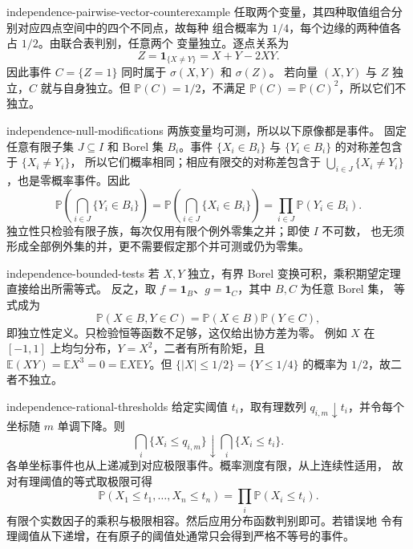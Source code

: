\begin{solution}{independence-pairwise-vector-counterexample}
任取两个变量，其四种取值组合分别对应四点空间中的四个不同点，故每种
组合概率为 $1/4$，每个边缘的两种值各占 $1/2$。由联合表判别，任意两个
变量独立。逐点关系为
\[
 Z=\mathbf 1_{\{X\ne Y\}}=X+Y-2XY.
\]
因此事件 $C=\{Z=1\}$ 同时属于 $\sigma(X,Y)$ 和 $\sigma(Z)$。
若向量 $(X,Y)$ 与 $Z$ 独立，$C$ 就与自身独立。但
$\mathbb P(C)=1/2$，不满足 $\mathbb P(C)=\mathbb P(C)^2$，所以它们不独立。
\end{solution}

\begin{solution}{independence-null-modifications}
两族变量均可测，所以以下原像都是事件。
固定任意有限子集 $J\subseteq I$ 和 Borel 集 $B_i$。事件
$\{X_i\in B_i\}$ 与 $\{Y_i\in B_i\}$ 的对称差包含于 $\{X_i\ne Y_i\}$，
所以它们概率相同；相应有限交的对称差包含于
$\bigcup_{i\in J}\{X_i\ne Y_i\}$，也是零概率事件。因此
\[
 \mathbb P\left(\bigcap_{i\in J}\{Y_i\in B_i\}\right)
 =\mathbb P\left(\bigcap_{i\in J}\{X_i\in B_i\}\right)
 =\prod_{i\in J}\mathbb P(Y_i\in B_i).
\]
独立性只检验有限子族，每次仅用有限个例外零集之并；即使 $I$ 不可数，
也无须形成全部例外集的并，更不需要假定那个并可测或仍为零集。
\end{solution}

\begin{solution}{independence-bounded-tests}
若 $X,Y$ 独立，有界 Borel 变换可积，乘积期望定理直接给出所需等式。
反之，取 $f=\mathbf 1_B$、$g=\mathbf 1_C$，其中 $B,C$ 为任意 Borel 集，
等式成为
\[
 \mathbb P(X\in B,Y\in C)=\mathbb P(X\in B)\mathbb P(Y\in C),
\]
即独立性定义。只检验恒等函数不足够，这仅给出协方差为零。
例如 $X$ 在 $[-1,1]$ 上均匀分布，$Y=X^2$，二者有所有阶矩，且
$\mathbb E(XY)=\mathbb E X^3=0=\mathbb E X\mathbb E Y$。但
$\{|X|\le1/2\}=\{Y\le1/4\}$ 的概率为 $1/2$，故二者不独立。
\end{solution}

\begin{solution}{independence-rational-thresholds}
给定实阈值 $t_i$，取有理数列 $q_{i,m}\downarrow t_i$，并令每个坐标随
$m$ 单调下降。则
\[
 \bigcap_i\{X_i\le q_{i,m}\}\downarrow\bigcap_i\{X_i\le t_i\}.
\]
各单坐标事件也从上递减到对应极限事件。概率测度有限，从上连续性适用，
故对有理阈值的等式取极限可得
\[
 \mathbb P(X_1\le t_1,\ldots,X_n\le t_n)
 =\prod_i\mathbb P(X_i\le t_i).
\]
有限个实数因子的乘积与极限相容。然后应用分布函数判别即可。若错误地
令有理阈值从下递增，在有原子的阈值处通常只会得到严格不等号的事件。
\end{solution}

